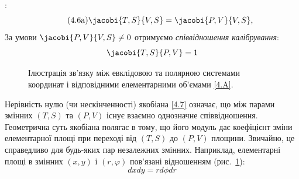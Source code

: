 :
\begin{equation}\label{4.6a}\tag{4.6a}
	\jacobi{T,S}{V,S} = \jacobi{P,V}{V,S},
\end{equation}
За умови $\jacobi{P,V}{V,S}\neq0$ отримуємо \emph{співвідношення калібрування}:
\begin{equation}\label{4.7}
	\jacobi{T,S}{P,V} =1
\end{equation}

\begin{figure}[h!]\centering
    
	\caption{ Ілюстрація зв'язку між евклідовою та полярною системами координат і відповідними
		елементарними об'ємами \eqref{4.A}.}
	\label{tikz:CartToPolar}
\end{figure}

Нерівність нулю (чи нескінченності) якобіана \eqref{4.7} означає, що між парами змінних $(T,S)$ та
$(P,V)$ існує взаємно однозначне співвідношення. Геометрична суть якобіана полягає в тому, що його
модуль дає коефіцієнт зміни елементарної площі при переході від $(T,S)$ до $(P,V)$ площини. Звичайно,
це справедливо для будь-яких пар незалежних змінних. Наприклад, елементарні площі в змінних $(x,y)$ і
$(r,\varphi)$ пов'язані відношенням (рис.~\ref{tikz:CartToPolar}):
\begin{equation}\label{4.A}\tag{A}
	dxdy = rd\phi dr
\end{equation}


